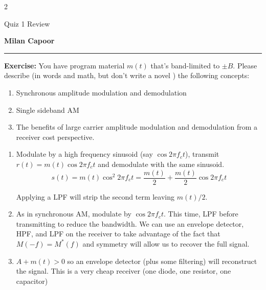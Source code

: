 \documentclass[12pt]{article}
\renewcommand{\div}{\vspace*{10pt}\hrule\vspace*{10pt}}
\newcommand*{\tbf}[1]{\ifmmode\mathbf{#1}\else\textbf{#1}\fi}
\newenvironment*{exercise}[1][red]{
    \begin{tcolorbox}[
        parbox=false,
        colback=#1!5!white,
        colframe=#1!75!black,
        breakable
    ]}
    {\end{tcolorbox}}
\begin{document}
\begin{multicols}{2}
    \begin{flushleft}
        \parbox{0.5\textwidth}{\Large Quiz 1 Review}
    \end{flushleft}
    \begin{flushright}
        \tbf{Milan Capoor}
    \end{flushright}
\end{multicols}
\div

\begin{exercise}
    \textbf{Exercise:}  You have program material $m(t)$ that's band-limited to $\pm B$. Please describe (in words and math, but don't write a novel ) the following concepts:
    \begin{enumerate}
        \item Synchronous amplitude modulation and demodulation
        \item Single sideband AM
        \item The benefits of large carrier amplitude modulation and demodulation from a receiver cost perspective.
    \end{enumerate}
\end{exercise}

\begin{enumerate}
    \item Modulate by a high frequency sinusoid (say $\cos 2\pi f_c t$), transmit $r(t) = m(t) \cos 2\pi f_c t$ and demodulate with the same sinusoid. 
    \[s(t) = m(t) \cos^2 2\pi f_c t = \frac{m(t)}{2} + \frac{m(t)}{2}\cos 2\pi f_c t\]
            
    Applying a LPF will strip the second term leaving $m(t) / 2$. 

    \item  As in synchronous AM, modulate by $\cos 2\pi f_c t$. This time, LPF before transmitting to reduce the bandwidth. We can use an envelope detector, HPF, and LPF on the receiver to take advantage of the fact that $M(-f) = M^*(f)$ and symmetry will allow us to recover the full signal. 
    
    \item $A + m(t) > 0$ so an envelope detector (plus some filtering) will reconstruct the signal. This is a very cheap receiver (one diode, one resistor, one capacitor)
\end{enumerate}
\end{document}

